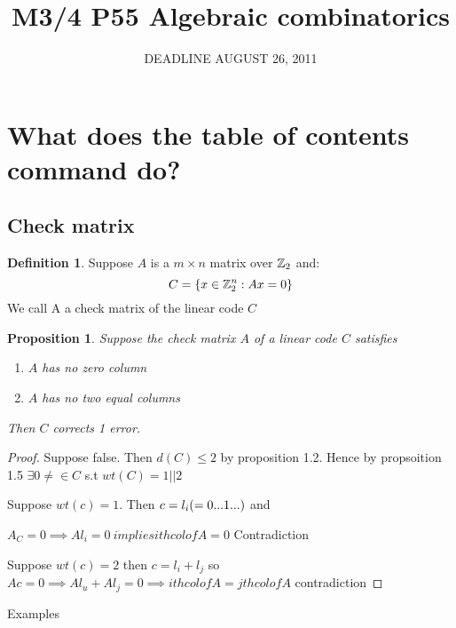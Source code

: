 \documentclass[]{amsart}
\title{M3/4 P55 Algebraic combinatorics}
\date{DEADLINE AUGUST 26, 2011}
\newtheorem{prop}[thm]{Proposition}
\theoremstyle{definition}
\newtheorem{defn}[thm]{Definition}
\theoremstyle{remark}
\numberwithin{equation}{section}
\begin{document}
\begin{abstract}
\end{abstract}

\maketitle

\tableofcontents

\section{What does the table of contents command do?}

\subsection{Check matrix}

\begin{defn}
Suppose \(A\) is a \(m \times n\) matrix over \(\mathbb{Z}_2\) and:
\begin{equation*}
C = \{ x \in \mathbb{Z}_2^n : Ax = 0\}
\end{equation*}
We call A a check matrix of the linear code $C$
\end{defn}

\begin{prop}
Suppose the check matrix $A$ of a linear code $C$ satisfies

\begin{enumerate}
	\item $A$ has no zero column
	\item $A$ has no two equal columns
\end{enumerate}
Then $C$ corrects 1 error.
\end{prop}

\begin{proof}
Suppose false. Then $d(C) \leq 2$ by proposition 1.2.
Hence by propsoition 1.5 $\exists 0\neq \in C$ s.t $wt(C) = 1 || 2$

Suppose $wt(c) = 1$. Then $c = l_i \space(=0 ... 1 ...)$ and 

$A_C = 0 \implies Al_i = 0 \ implies ith col of A = 0$ Contradiction

Suppose $wt(c) = 2$ then $c = l_i + l_j$ so 
$Ac = 0 \implies Al_u + Al_j = 0 \implies ith col of A = jth col of A$ contradiction
\end{proof}

Examples
\end{document}

